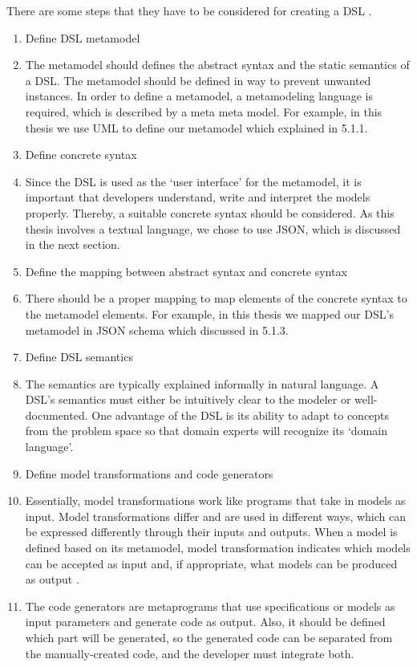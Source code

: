 There are some steps that they have to be considered for creating a DSL \cite{mdsd_en}.

\begin{enumerate}
\item Define DSL metamodel
    \item[] The metamodel should defines the abstract syntax and the static semantics of a DSL. The metamodel should be defined in way to prevent unwanted instances. In order to define a metamodel, a metamodeling language is required, which is described by a meta meta model. For example, in this thesis we use UML to define our metamodel which explained in 5.1.1.

\item Define concrete syntax
    \item[] Since the DSL is used as the ‘user interface’ for the metamodel, it is important that developers understand, write and interpret the models properly. Thereby, a suitable concrete syntax should be considered. As this thesis involves a textual language, we chose to use JSON, which is discussed in the next section.
\item Define the mapping between abstract syntax and concrete syntax
    \item[] There should be a proper mapping to map elements of the concrete syntax to the metamodel elements. For example, in this thesis we mapped our DSL's metamodel in JSON schema which discussed in 5.1.3.

\item Define DSL semantics
    \item[] The semantics are typically explained informally in natural language. A DSL's semantics must either be intuitively clear to the modeler or well-documented. One advantage of the DSL is its ability to adapt to concepts from the problem space so that domain experts will recognize its ‘domain language’.
\item Define model transformations and code generators
    \item[] Essentially, model transformations work like programs that take in models as input. Model transformations differ and are used in different ways, which can be expressed differently through their inputs and outputs. When a model is defined based on its metamodel, model transformation indicates which models can be accepted as input and, if appropriate, what models can be produced as output \cite{model_transformation}.
    \item[] The code generators are metaprograms that use specifications or models as input parameters and generate code as output.  Also, it should be defined which part will be generated, so the generated code can be separated from the manually-created code, and the developer must integrate both.

\end{enumerate}

